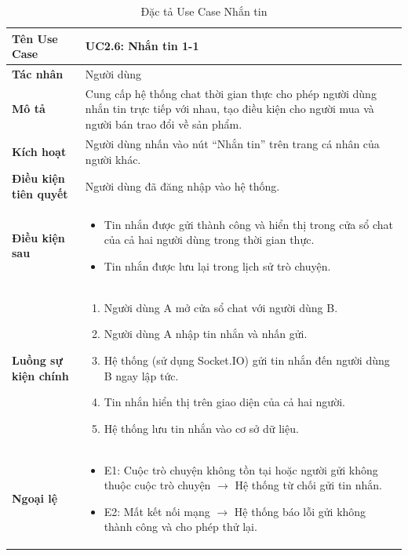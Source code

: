 \begin{table}[H]
\centering
\begin{tabularx}{\textwidth}{|l|X|}
\hline
\textbf{Tên Use Case} & \textbf{UC2.6: Nhắn tin 1-1} \\ \hline
\textbf{Tác nhân} & Người dùng \\ \hline
\textbf{Mô tả} & Cung cấp hệ thống chat thời gian thực cho phép người dùng nhắn tin trực tiếp với nhau, tạo điều kiện cho người mua và người bán trao đổi về sản phẩm. \\ \hline
\textbf{Kích hoạt} & Người dùng nhấn vào nút ``Nhắn tin'' trên trang cá nhân của người khác. \\ \hline
\textbf{Điều kiện tiên quyết} & Người dùng đã đăng nhập vào hệ thống. \\ \hline
\textbf{Điều kiện sau} & 
\begin{itemize}
    \item Tin nhắn được gửi thành công và hiển thị trong cửa sổ chat của cả hai người dùng trong thời gian thực.
    \item Tin nhắn được lưu lại trong lịch sử trò chuyện.
\end{itemize} \\ \hline
\textbf{Luồng sự kiện chính} & 
\begin{enumerate}
    \item Người dùng A mở cửa sổ chat với người dùng B.
    \item Người dùng A nhập tin nhắn và nhấn gửi.
    \item Hệ thống (sử dụng Socket.IO) gửi tin nhắn đến người dùng B ngay lập tức.
    \item Tin nhắn hiển thị trên giao diện của cả hai người.
    \item Hệ thống lưu tin nhắn vào cơ sở dữ liệu.
\end{enumerate} \\ \hline
\textbf{Ngoại lệ} & 
\begin{itemize}
    \item E1: Cuộc trò chuyện không tồn tại hoặc người gửi không thuộc cuộc trò chuyện $\rightarrow$ Hệ thống từ chối gửi tin nhắn.
    \item E2: Mất kết nối mạng $\rightarrow$ Hệ thống báo lỗi gửi không thành công và cho phép thử lại.
\end{itemize} \\ \hline
\end{tabularx}
\caption{Đặc tả Use Case Nhắn tin}
\end{table}


